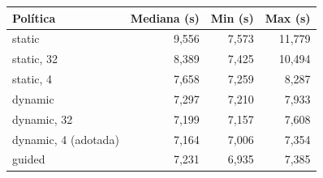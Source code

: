 \documentclass[10pt,a4paper]{article}
\begin{document}
\begin{center}
\vspace{5pt}
\label{tab:sched}
\begin{tabular}{l r r r}
  \toprule
  Pol\'itica & Mediana (s) & Min (s) & Max (s) \\
  \midrule
  static               & 9{,}556 & 7{,}573 & 11{,}779 \\
  static, 32           & 8{,}389 & 7{,}425 & 10{,}494 \\
  static, 4            & 7{,}658 & 7{,}259 &  8{,}287 \\
  dynamic              & 7{,}297 & 7{,}210 &  7{,}933 \\
  dynamic, 32          & 7{,}199 & 7{,}157 &  7{,}608 \\
  dynamic, 4 (adotada) & 7{,}164 & 7{,}006 &  7{,}354 \\
  guided               & 7{,}231 & 6{,}935 &  7{,}385 \\
  \bottomrule
\end{tabular}
\end{center}
\end{document}

